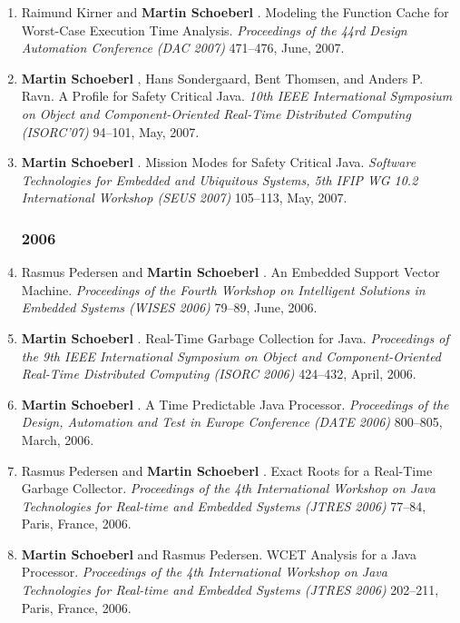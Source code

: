 \begin{enumerate}
\item Raimund Kirner and {\bf Martin Schoeberl }.
 Modeling the Function Cache for Worst-Case Execution Time Analysis.
 \emph{Proceedings of the 44rd Design Automation Conference (DAC 2007)} 471--476, June, 2007.

\item {\bf Martin Schoeberl }, Hans Sondergaard, Bent Thomsen, and Anders P. Ravn.
 A Profile for Safety Critical Java.
 \emph{10th IEEE International Symposium on Object and Component-Oriented Real-Time Distributed Computing (ISORC'07)} 94--101, May, 2007.

\item {\bf Martin Schoeberl }.
 Mission Modes for Safety Critical Java.
 \emph{Software Technologies for Embedded and Ubiquitous Systems, 5th {IFIP} {WG} 10.2 International Workshop (SEUS 2007)} 105--113, May, 2007.


\subsubsection*{2006}

\item Rasmus Pedersen and {\bf Martin Schoeberl }.
 An Embedded Support Vector Machine.
 \emph{Proceedings of the Fourth Workshop on Intelligent Solutions in Embedded Systems (WISES 2006)} 79--89, June, 2006.

\item {\bf Martin Schoeberl }.
 Real-Time Garbage Collection for Java.
 \emph{Proceedings of the 9th IEEE International Symposium on Object and Component-Oriented Real-Time Distributed Computing (ISORC 2006)} 424--432, April, 2006.

\item {\bf Martin Schoeberl }.
 A Time Predictable Java Processor.
 \emph{Proceedings of the Design, Automation and Test in Europe Conference (DATE 2006)} 800--805, March, 2006.

\item Rasmus Pedersen and {\bf Martin Schoeberl }.
 Exact Roots for a Real-Time Garbage Collector.
 \emph{Proceedings of the 4th International Workshop on Java Technologies for Real-time and Embedded Systems (JTRES 2006)} 77--84, Paris, France, 2006.

\item {\bf Martin Schoeberl } and Rasmus Pedersen.
 WCET Analysis for a Java Processor.
 \emph{Proceedings of the 4th International Workshop on Java Technologies for Real-time and Embedded Systems (JTRES 2006)} 202--211, Paris, France, 2006.



\end{enumerate}
